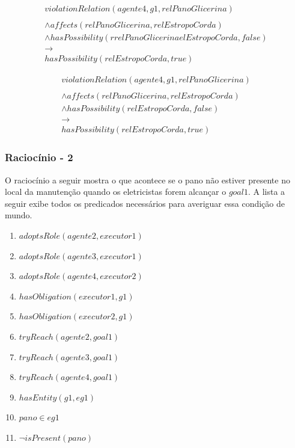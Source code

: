 \documentclass[12pt]{article}
\begin{document}
\begin{eqnarray}\nonumber
	violationRelation(agente4,g1,relPanoGlicerina)  \nonumber \\ 
	\nonumber \\ 
	\wedge affects(relPanoGlicerina,relEstropoCorda)   \nonumber \\ 
	\wedge hasPossibility(rrelPanoGlicerinaelEstropoCorda,false) \nonumber \\  
	\to \nonumber \\  
	hasPossibility(relEstropoCorda,true) 
\end{eqnarray}

\begin{eqnarray}\nonumber
	violationRelation(agente4,g1,relPanoGlicerina)  \nonumber \\ 
	\nonumber \\ 
	\wedge affects(relPanoGlicerina,relEstropoCorda)   \nonumber \\ 
	\wedge hasPossibility(relEstropoCorda,false) \nonumber \\  
	\to \nonumber \\  
	hasPossibility(relEstropoCorda,true) 
\end{eqnarray}



\subsubsection{Raciocínio - 2} 

O raciocínio a seguir mostra o que acontece se o pano não estiver presente no local da manutenção quando os eletricistas forem alcançar o $goal1$. A lista a seguir exibe todos os predicados necessários para averiguar essa condição de mundo. 


\begin{enumerate}
	\item $adoptsRole(agente2,executor1)$ 
	\item $adoptsRole(agente3,executor1)$	 	
	\item $adoptsRole(agente4,executor2)$	 
	\item $hasObligation(executor1,g1)$
	\item $hasObligation(executor2,g1)$
	\item $tryReach(agente2,goal1)$ 
	\item $tryReach(agente3,goal1)$	 	
	\item $tryReach(agente4,goal1)$	
	\item $hasEntity(g1,eg1)$		
	\item $pano \in eg1$
	\item $\neg isPresent(pano)$
\end{enumerate}
\end{document}
